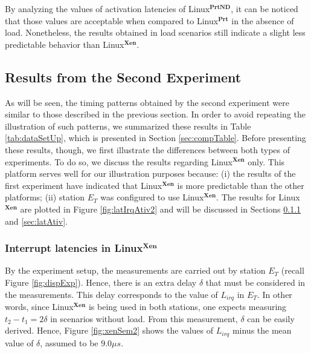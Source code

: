 \documentclass{acm_proc_article-sp}
\begin{document}
By analyzing the values of activation latencies of Linux$^{\mathbf{PrtND}}$, 
it can be noticed that those values are acceptable when compared to
Linux$^{\mathbf{Prt}}$ in the absence of load. 
Nonetheless, the results obtained in load scenarios still indicate a slight
less predictable behavior than Linux$^{\mathbf{Xen}}$.

\subsection{Results from the Second Experiment}
\label{sec:results-2}

As will be seen, the timing patterns obtained by the second experiment were similar
to those described in the previous section. In order to avoid repeating the
illustration of such patterns, we summarized these results in Table
\ref{tab:dataSetUp}, which is presented in Section \ref{sec:compTable}. Before
presenting these results, though, we first illustrate the differences between both
types of experiments. To do so, we discuss the results regarding
Linux$^{\mathbf{Xen}}$ only. This platform serves well for our illustration purposes
because: (i) the results of the first experiment have indicated that
Linux$^{\mathbf{Xen}}$ is more predictable than the other platforms; (ii) station
$E_T$ was configured to use Linux$^{\mathbf{Xen}}$.  The results for
Linux$^{\mathbf{Xen}}$ are plotted in Figure \ref{fig:latIrqAtiv2} and will be
discussed in Sections \ref{sec:latIrq} and \ref{sec:latAtiv}.

\subsubsection{Interrupt latencies in Linux$^{\mathbf{Xen}}$}
\label{sec:latIrq}

By the experiment setup, the measurements are carried out by station $E_T$ (recall
Figure \ref{fig:dispExp}). Hence, there is an extra delay $\delta$ that must be
considered in the measurements. This delay corresponds to the value of $L_{irq}$ in
$E_T$. In other words, since Linux$^{\mathbf{Xen}}$ is being used in both
  stations, one expects measuring $t_2 - t_1 = 2 \delta$ in scenarios without
  load. From this measurement, $\delta$ can be easily derived. Hence, Figure
  \ref{fig:xenSem2} shows the values of $L_{irq}$ minus the mean value of $\delta$,
assumed to be $9.0 \mu s$.

\end{document}
